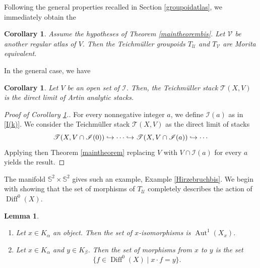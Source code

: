 \documentclass[10pt]{amsart}
\let\mathcal\mathscr
\def\hto{\mathrel{\lhook\joinrel\to}}
\DeclareMathOperator{\Aut}{Aut}
\DeclareMathOperator{\Diff}{Diff}
\theoremstyle{plain}
\newtheorem{corollary}[theorem]{Corollary}
\newtheorem{lemma}[theorem]{Lemma}
\theoremstyle{definition}
\theoremstyle{remark}
\numberwithin{equation}{section}
\newcommand{\cI}{\mathcal{I}}
\providecommand{\skpt}{\par\smallskip\noindent}
\begin{document}
Following the general properties recalled in Section \ref{groupoidatlas}, we immediately obtain the

\begin{corollary}
\label{TeichMoritaind}
Assume the hypotheses of Theorem \ref{maintheorembis}. Let $\mathcal V$ be another regular atlas of $V$. Then the Teichmüller groupoids $T_\mathcal U$ and $T_\mathcal V$ are Morita equivalent.
\end{corollary}

In the general case, we have

\begin{corollary}
\label{maincorollary}
Let $V$ be an open set of $\cI$. Then, the Teichmüller stack $\mathcal T(X,V)$ is the direct limit of Artin analytic stacks.
\end{corollary}

\begin{proof}[Proof of Corollary \ref{maincorollary}.]
For every nonnegative integer $a$, we define $\cI(a)$ as in \eqref{I(k)}. We consider the Teichmüller stack $\mathcal T(X,V)$ as the direct limit of stacks
\begin{equation}
\label{directlimit}
\mathcal T(X,V\cap \cI(0))\hto \cdots\hto \mathcal T(X,V\cap \cI(a))\hto \cdots
\end{equation}
Applying then Theorem \ref{maintheorem} replacing $V$ with $V\cap \cI(a)$ for every $a$ yields the result.
\end{proof}

The manifold $\mathbb S^2\times \mathbb S^2$ gives such an example, \cf Example \ref{Hirzebruchbis}. We begin with showing that the set of morphisms of $T_{\mathcal{U}}$ completely describes the action of $\Diff^0(X)$.

\skpt
\begin{lemma}
\label{isoteich}
\begin{enumerate}
\item\label{isoteich1}
Let $x\in K_\alpha$ an object. Then the set of $x$-isomorphisms is $\Aut^1(X_x)$.
\item\label{isoteich2}
Let $x\in K_\alpha$ and $y\in K_\beta$. Then the set of morphisms from $x$ to $y$ is the set
\begin{equation}
\label{morphismsxy}
\{f\in\Diff^0(X)\mid x\cdot f=y\}.
\end{equation}
\end{enumerate}
\end{lemma}
\end{document}
